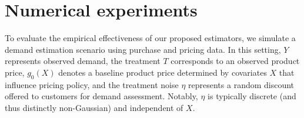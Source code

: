 \documentclass{article}
\begin{document}
%
%
%
%

%





%
%


%









%
\section{Numerical experiments}
\label{sec:experiments}

To evaluate the empirical effectiveness of our proposed estimators, we simulate a demand estimation scenario using purchase and pricing data. In this setting, $Y$ represents observed demand, the treatment $T$ corresponds to an observed product price, $g_0(X)$ denotes a baseline product price determined by covariates $X$ that influence pricing policy, and the treatment noise $\eta$ represents a random discount offered to customers for demand assessment. Notably, $\eta$ is typically discrete (and thus distinctly non-Gaussian) and independent of $X$.
\end{document}
